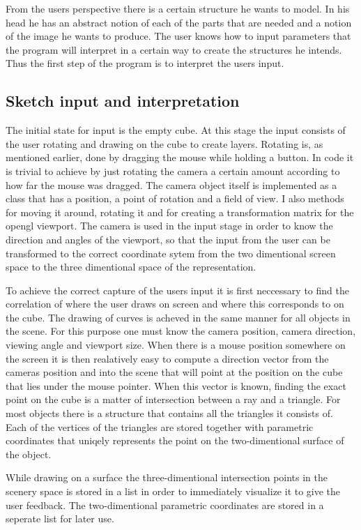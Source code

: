 \documentclass[a4paper,12pt]{report}
\begin{document}
From the users perspective there is a certain structure he wants to model. In his head he has an abstract notion of each of the parts that are needed and a notion of the image he wants to produce. The user knows how to input parameters that the program will interpret in a certain way to create the structures he intends. Thus the first step of the program is to interpret the users input.

\subsection{Sketch input and interpretation}
The initial state for input is the empty cube. At this stage the input consists of the user rotating and drawing on the cube to create layers. Rotating is, as mentioned earlier, done by dragging the mouse while holding a button. In code it is trivial to achieve by just rotating the camera a certain amount according to how far the mouse was dragged. The camera object itself is implemented as a class that has a position, a point of rotation and a field of view. I also methods for moving it around, rotating it and for creating a transformation matrix for the opengl viewport. The camera is used in the input stage in order to know the direction and angles of the viewport, so that the input from the user can be transformed to the correct coordinate sytem from the two dimentional screen space to the three dimentional space of the representation.

 To achieve the correct capture of the users input it is first neccessary to find the correlation of where the user draws on screen and where this corresponds to on the cube. The drawing of curves is acheved in the same manner for all objects in the scene. For this purpose one must know the camera position, camera direction, viewing angle and viewport size. When there is a mouse position somewhere on the screen it is then realatively easy to compute a direction vector from the cameras position and into the scene that will point at the position on the cube that lies under the mouse pointer. When this vector is known, finding the exact point on the cube is a matter of intersection between a ray and a triangle. For most objects there is a structure that contains all the triangles it consists of. Each of the vertices of the triangles are stored together with parametric coordinates that uniqely represents the point on the two-dimentional surface of the object.

While drawing on a surface the three-dimentional intersection points in the scenery space is stored in a list in order to immediately visualize it to give the user feedback. The two-dimentional parametric coordinates are stored in a seperate list for later use.
\end{document}
